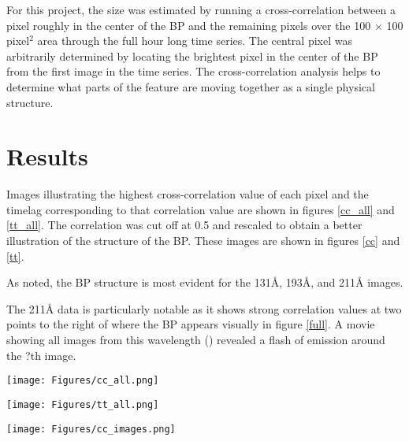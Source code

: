 \documentclass[preprint2]{aastex}
\begin{document}
For this project, the size was estimated by running a cross-correlation between
a pixel roughly in the center of the BP and the remaining pixels over the
100 $\times$ 100 pixel$^{2}$ area through the full hour long time series.
The central pixel was arbitrarily determined by locating the brightest pixel in the center
of the BP from the first image in the time series. The cross-correlation analysis
helps to determine what parts of the feature are moving together as a single
physical structure.

\section{Results}\label{results}
Images illustrating the highest cross-correlation value of each pixel and the
timelag corresponding to that correlation value are shown in figures \ref{cc_all}
and \ref{tt_all}. The correlation was cut off at 0.5 and rescaled to obtain a
better illustration of the structure of the BP. These images are shown in
figures \ref{cc} and \ref{tt}.

As \cite{Alipour} noted, the BP structure is most evident for the
131\AA{}, 193\AA{}, and 211\AA{} images.

The 211\AA{} data is particularly notable as it shows strong correlation values
at two points to the right of where the BP appears visually in figure \ref{full}.
A movie showing all images from this wavelength (\cite{ssw}) revealed a flash
of emission around the ?th image.

\begin{figure*}[htb!]
    \texttt{[image: Figures/cc\_all.png]}
    \caption{Images showing the highest cross-correlation value for each pixel. }
    \label{cc_all}
\end{figure*}

\begin{figure*}[htb!]
    \texttt{[image: Figures/tt\_all.png]}
    \caption{Images showing the timelag corresponding to the correlation values
        illustrated in figure \ref{cc_all}. (This is not the correct image; I accidently
        overwrote the correct one, but can't re-create it because IDL is giving me
        syntax errors on my function keywords for no apparent reason.)}
    \label{tt_all}
\end{figure*}

\begin{figure*}[htb!]
    \texttt{[image: Figures/cc\_images.png]}
    \caption{Cross-correlation images scaled to show only values higher than 0.5.}
    \label{cc}
\end{figure*}
\end{document}
